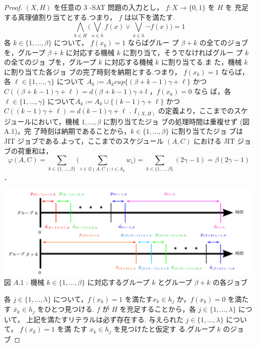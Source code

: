 \documentclass[12pt]{optlab-bachelor}
\begin{document}
\begin{proof}
  $(X,H)$ を任意の 3 -SAT 問題の入力とし， $f : X \to \{0,1\}$ を $H$ を
  充足する真理値割り当てとする.つまり， $f$ は以下を満たす.
  $$\displaystyle \bigwedge_{h \in H} \bigg(\bigvee_{x \in h}f(x) \lor
    \bigvee_{\bar x \in h}\lnot f(x) \bigg) = 1$$
  各 $k \in \{1,\ldots, \beta\}$ について， $f(x_k) = 1$ ならばグルー
  プ $\beta + k$ の全てのジョブを，グループ $\beta + k$ に対応する機械
  $k$ に割り当て，そうでなければグルー
  プ $k$ の全てのジョ ブを，グループ $k$ に対応する機械 $k$ に割り当てる.ま
  た，機械 $k$ に割り当てた各ジョ ブの完了時刻を納期とする.つまり，
  $f(x_k) = 1$ ならば，各 $\ell \in \{1,\ldots,\gamma\}$ について $A_k
  :=A_k cup\{(\beta+k−1)\gamma+\ell\}$ かつ
  $C((\beta+k−1)\gamma+\ell)=d(\beta+k−1)\gamma+l$ ，$f(x_k)=0$ なら
  ば，各 $\ell \in \{1,\ldots,\gamma \}$ について$A_k :=A_k \cup
  \{(k−1)\gamma+\ell \}$ かつ $C((k−1)\gamma+\ell)=d(k−1)\gamma+\ell$
  . $I_{(X,H)}$ の定義より，ここまでのスケジュールにおいて，機械
  $1,\ldots, \beta$ に割り当てたジョ ブの処理時間は重複せず (図 A.1)，完
  了時刻は納期であることから，$k \in \{1,\ldots,\beta\}$ に割り当てたジョ
  ブは JIT ジョブである.よって，ここまでのスケジュール $(A, C)$ における
  JIT ジョブの荷重和は，
  $$\displaystyle \varphi(A,C) = \sum_{k \in
    \{1,\ldots,\beta\}}\bigg(\sum_{i \in \mathcal{Q}(A,C):i \in
    A_k}w_i\bigg) = \sum_{k \in \{1,\ldots,\beta\}}(2\gamma - 1) =
  \beta(2\gamma - 1)$$．
  \begin{center}
    \includegraphics[width = 15cm]{SJIT1.png} \\
    図 $A.1$ : 機械 $k \in \{1,\ldots,\beta\}$ に対応するグループ $k$
    とグループ $\beta + k$ の各ジョブ
  \end{center}
  各 $j\in \{1,\ldots,\lambda\}$ について，$f(x_k)=1$ を満たす$x_k \in
  h_j$ か，$f(x_k)=0$ を満たす $\bar x_k \in h_j$ をひとつ見つける. $f$ が $H$ を充足することから，各 $j \in \{1,\ldots,\lambda\}$ について， 上記を満たすリテラルは必ず存在する.
  与えられた $j \in \{1,\ldots,\lambda \}$ について， $f(x_k) = 1$ を満
  たす $x_k \in h_j$ を見つけたと仮定す る.グループ $k$ のジョブ

\end{proof}
\end{document}

